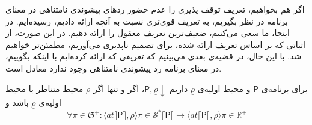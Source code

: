 اگر هم بخواهیم، تعریف توقف پذیری را عدم حضور ردهای پیشوندی نامتناهی در معنای برنامه در نظر بگیریم، به تعریف قوی‌تری نسبت به آنچه ارائه دادیم، رسیده‌ایم. در اینجا، ما سعی می‌کنیم، ضعیف‌ترین تعریف معقول را ارائه دهیم. در این صورت، از اثباتی که بر اساس تعریف ارائه شده، برای تصمیم ناپذیری می‌آوریم، مطمئن‌تر خواهیم شد. با این حال، در قضیه‌ی بعدی می‌بینیم که تعریفی که ارائه کرده‌ایم با اینکه بگوییم، در معنای برنامه رد پیشوندی نامتناهی وجود ندارد معادل است.
\begin{thm}
	برای برنامه‌ی $\mathsf{P}$ و محیط اولیه‌ی $\underline{\rho}$ داریم $\mathsf{P} , \underline{\rho} \downarrow $، اگر و تنها اگر $\rho$ محیط متناظر با محیط اولیه‌ی $\underline{\rho}$ باشد و
	$$\forall \pi \in \mathfrak{S^{+}} : 
	\langle at \llbracket \mathsf{P} \rrbracket , \rho \rangle \pi \in \mathcal{S^*} \llbracket \mathsf{P} \rrbracket \rightarrow
	\langle at \llbracket \mathsf{P} \rrbracket , \rho \rangle \pi \in \mathbb{R^+}$$
	 
\end{thm}

